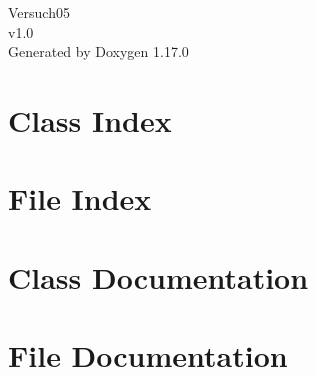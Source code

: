 \documentclass[twoside]{book}
\newcommand{\+}{\discretionary{\mbox{\scriptsize$\hookleftarrow$}}{}{}}
\newcommand{\clearemptydoublepage}{%
    \newpage{\pagestyle{empty}\cleardoublepage}%
  }
\begin{document}
  \raggedbottom
    \hypersetup{pageanchor=false,
                bookmarksnumbered=true,
                pdfencoding=unicode
               }
  \begin{titlepage}
  \vspace*{7cm}
  \begin{center}%
  {\Large Versuch05}\\
  [1ex]\large v1.\+0 \\
  \vspace*{1cm}
  {\large Generated by Doxygen 1.17.0}\\
  \end{center}
  \end{titlepage}
  \clearemptydoublepage
  \tableofcontents
  \clearemptydoublepage
  \hypersetup{pageanchor=true}

\chapter{Class Index}

\chapter{File Index}

\chapter{Class Documentation}



\chapter{File Documentation}



  \backmatter
  \newpage
  \clearemptydoublepage
  \printindex
\end{document}
